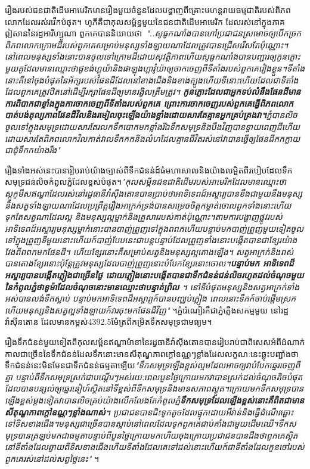 \documentclass[10pt,twocolumn,letterpaper]{article}
\begin{document}
រឿងរបស់ជនជាតិដើមអាមេរិកមានរឿងមួយចំនួនដែលបង្ហាញពីគ្រោះមហន្តរាយធម្មជាតិរបស់ពិភពលោកដែលរស់រវើកបំផុត។ ហូភីគឺជាកុលសម្ព័ន្ធមួយនៃជនជាតិដើមអាមេរិក ដែលរស់នៅក្នុងភាគឦសាននៃរដ្ឋអារីហ្សូណា ពួកគេបាននិយាយថា\, \textit{"..សូធូកណាំងបានហៅប្រជាជនស្រមោចឲ្យបើកច្រកពិភពលោកក្រោមដីរបស់ពួកគេសម្រាប់មនុស្សទាំងឡាយណាដែលត្រូវបានជ្រើសរើសតែប៉ុណ្ណោះ។ នៅពេលមនុស្សទាំងនោះបានចូលទៅក្រោមដីដោយសុវត្ថិភាពហើយ​សូធូកណាំងបានបញ្ជារឲ្យកូនភ្លោះមួយគូដែលមានឈ្មោះថា​ផូខង់ហ្គូយ៉ានិង​ផាឡុងហ្គាវ៉ូយ៉ាឲ្យចាកចេញពីទីតាំងរបស់ពួកគេរៀងខ្លួន។​ទីតាំងនោះគឺនៅចុងបំផុតនៃអ័ក្សរបស់ផែនដីដែលនៅខាងជើងនិងខាងត្បូង​ហើយទីនោះហើយដែលជាទីតាំងដែលពួកគេត្រូវឋិតនៅដើម្បីរក្សាផែនដីឲ្យមានរង្វិលត្រឹមត្រូវ។ \textbf{កូនភ្លោះដែលជាអ្នកទប់លំនឹងផែនដីមានការពិបាកជាខ្លាំងក្នុងការចាកចេញពីទីតាំងរបស់ពួកគេ ព្រោះការចាកចេញរបស់ពួកគេធ្វើពិភពលោកបាត់បង់តុល្យភាព​ផែនដីវិល​និង​រមៀលចុះឡើងយ៉ាងខ្លាំងដោយសារតែគ្មានអ្នកគ្រប់គ្រងវា។}ភ្នំបានលិចចូលទៅក្នុងសមុទ្រដោយសារតែរលកទឹកបោកមកខ្លាំង​រីឯទឹកសមុទ្រនិងបឹងវិញបានខ្ចាយពេញដី​ហើយដោយសារតែពិភពលោកវិលកាត់វាលទឹកកកនិងលំហដែលគ្មានជីវិតរស់នៅ​វាបានធ្វើឲ្យផែនដីកកក្លាយជាដុំទឹកកយ៉ាងរឹង"} \cite{4}

រឿងទាំងអស់នេះបានរៀបរាប់យ៉ាងច្បាស់ពីទឹកជំនន់ដ៍ធំមហាសាលនិងយ៉ាងលម្អិតពីរបៀបដែលទឹកសមុទ្រជន់លិចកំពូលភ្នំដែលខ្ពស់បំផុត។\textit{"កុលសម្ព័នជនជាតិដើមរបស់អាមេរិកដែលមានឈ្មោះថា​ស្កូកូមីស​ឥណ្ឌាដែលរស់នៅរដ្ធធានីវ៉ាស៊ីងតោនបានប្រាប់ថា​អាទិទេពដ៍អស្ចារ្យបានខឹងជាមួយនឹងមនុស្សនិងសត្វទាំងឡាយណាដែលប្រព្រឹត្តរឿងអាក្រក់​ទ្រង់បានសម្រេចចិត្តកម្ចាត់ចោលពួកទាំងនោះហើយទុកតែសត្វណាដែលល្អ និង​មនុស្សល្អម្នាក់និងគ្រួសាររបស់គាត់ប៉ុណ្ណោះ។តាមការបង្ហាញផ្លូវរបស់អាទិទេពដ៍អស្ចារ្យ​មនុស្សម្នាក់នោះបានបាញ់ព្រួញទៅក្នុងពពក​ហើយបន្ទាប់មកបាញ់ព្រួញមួយទៀតចូលទៅក្នុងព្រួញទីមួយនោះ​ហើយក៍បាញ់បែបនេះជាបន្តបន្ទាប់ដែលព្រួញទាំងនោះបង្កើតបានជាខ្សែរយ៉ាងវែងពីពពកមកផែនដី។ ហើយខ្សែរនោះគឺសម្រាប់សត្វនិងមនុស្សល្អតោងឡើង។ សត្វអាក្រក់និងពស់បានតោងខ្សែរនោះប៉ុន្តែត្រូវមនុស្សដែលបាញ់ព្រួញនោះបំបែកខ្សែរនោះចោល។\textbf{បន្ទាប់មក អាទិទេពដ៏អស្ចារ្យបានបង្កើតភ្លៀងជាច្រើនថ្ងៃ ដោយភ្លៀងនោះបង្កើតបានជាទឹកជំនន់ជន់លិចរហូតដល់ចំណុចមួយនៃកំពូលភ្នំ​ថាខូម៉ា​ដែលចំណុចនោះមានឈ្មោះថា​បន្ទាត់ព្រិល }។ នៅទីបំផុតមនុស្សនិងសត្វអាក្រក់ទាំងអស់បានលង់ទឹកស្លាប់ បន្ទាប់មកអាទិទេពដ៏អស្ចារ្យក៍បានបញ្ឈប់ភ្លៀង ពេលនោះទឹកក៍ចាប់ផ្តើមស្រកហើយមនុស្សនិងសត្វល្អទាំងឡាយក៍វារចុះមកផែនដីវិញ"} \cite{3}។​ភ្នំរ៉េណៀរគឺជាភ្នំភ្លើងសកម្មមួយ នៅរដ្ឋវ៉ាស៊ីនតោន ដែលមានកម្ពស់​4392.5ម៉ែត្រពីកម្រិតទឹកសមុទ្រជាមធ្យម។

រឿងទឹកជំនន់មួយទៀតពីកុលសម្ព័នឥណ្ឌា​ម៉ាខា​នៃរដ្ធធានីវ៉ាស៊ីងតោនបានរៀបរាប់ជាពិសេសអំពីដំណាក់កាលជាច្រើននៃទឹកជំនន់ដែលទឹកនោះមានសីតុណ្ហភាពក្តៅឧណ្ណៗខ្លាំង​ដែលលក្ខណៈនេះឆ្លុះបញ្ជាំងថាទឹកជំនន់នេះមិនមែនជាទឹកជំនន់ធម្មតាឡើយ\textit{"ទឹកសមុទ្រឡើងខ្ពស់ល្មមដែលអាចឲ្យវាបំបែកឆ្នេរចេញពីគ្នា បន្ទាប់ពីទឹកសមុទ្រស្រក់ជាបណ្តើរៗ​អស់រយៈពេលបួនថ្ងៃក្រោយមកវាបានស្រក់ដល់ចំណុចតិចបំផុតដែលបានបន្សល់ឲ្យឆ្នេរនៀហ៍ស្ថិតនៅទីខ្ពស់ពីទឹកសមុទ្រនិងមានសភាពស្ងួត។ក្រោយមកទឹកសមុទ្របានឡើងខ្ពស់ម្តងទៀត​វាបានលិចគ្រប់យ៉ាងលើកលែងតែកំពូលភ្នំ\textbf{ទឹកសមុទ្រដែលឡើងខ្ពស់នោះគឺពិតជាមានសីតុណ្ហភាពក្តៅឧណ្ណៗខ្លាំងណាស់}។ ប្រជាជនបានជិះទូកតូចដែលផ្ទុកដោយអីវ់ាន់​និង​ធ្វើដំណើរឆ្ពោះទៅទិសខាងជើង។​មនុស្សជាច្រើនបានស្លាប់នៅពេលដែលទូកពួកគេជាប់គាំងជាមួយដើមឈើ។ទឹកសមុទ្របានត្រឡប់មកជាធម្មតាបន្ទាប់ពីបួនថ្ងៃក្រោយមក​ហើយចុងក្រោយប្រជាជនបានដឹងថាពួកគេស្ថិតនៅទីតាំងដែលឆ្ងាយពីទិសខាងជើង​ហើយទីតាំងដែលគេទៅដល់នោះហើយក៍ជាទីតាំងដែលកូនចៅរបស់ពួកគេរស់នៅដល់សព្វថ្ងៃនេះ"} \cite{3}។
\end{document}

